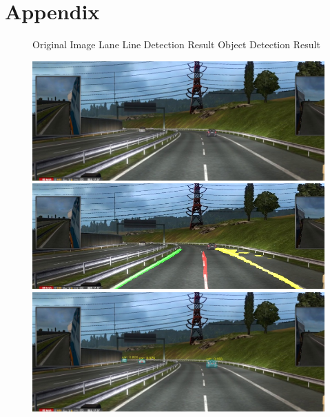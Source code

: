 \documentclass[runningheads]{llncs}
\begin{document}
\section{Appendix}
\begin{figure}[!htb]
	Original Image
	\endminipage\hfill
	Lane Line Detection Result
	\endminipage\hfill
	Object Detection Result
	\endminipage

    \includegraphics[width=\linewidth]{result/w000059.jpg}
    \endminipage\hfill
    \includegraphics[width=\linewidth]{result/w000059-lane.jpg}
    \endminipage\hfill
    \includegraphics[width=\linewidth]{result/w000059-obj.jpg}
    \endminipage



\end{figure}
\end{document}
